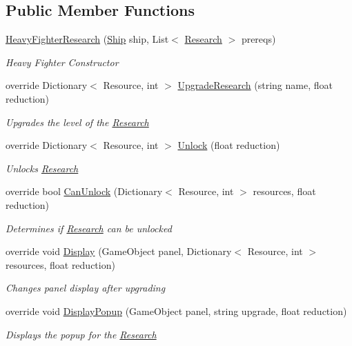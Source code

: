 \subsection*{Public Member Functions}
\begin{DoxyCompactItemize}
\item 
\hyperlink{class_heavy_fighter_research_a3b6b83b4c4dce96dafdefe3c9d2ce736}{Heavy\+Fighter\+Research} (\hyperlink{class_ship}{Ship} ship, List$<$ \hyperlink{class_research}{Research} $>$ prereqs)
\begin{DoxyCompactList}\small\item\em Heavy Fighter Constructor \end{DoxyCompactList}\item 
override Dictionary$<$ Resource, int $>$ \hyperlink{class_heavy_fighter_research_aad96c063ea5f6e3b473f4bd9dd7dcc86}{Upgrade\+Research} (string name, float reduction)
\begin{DoxyCompactList}\small\item\em Upgrades the level of the \hyperlink{class_research}{Research} \end{DoxyCompactList}\item 
override Dictionary$<$ Resource, int $>$ \hyperlink{class_heavy_fighter_research_ac5fb9e14f64823b2386e0dbc35992ea4}{Unlock} (float reduction)
\begin{DoxyCompactList}\small\item\em Unlocks \hyperlink{class_research}{Research} \end{DoxyCompactList}\item 
override bool \hyperlink{class_heavy_fighter_research_a5ff354ea940ac34f4da1be6246eba690}{Can\+Unlock} (Dictionary$<$ Resource, int $>$ resources, float reduction)
\begin{DoxyCompactList}\small\item\em Determines if \hyperlink{class_research}{Research} can be unlocked \end{DoxyCompactList}\item 
override void \hyperlink{class_heavy_fighter_research_a867ed4fb05de870ec77e80dd93ae5f19}{Display} (Game\+Object panel, Dictionary$<$ Resource, int $>$ resources, float reduction)
\begin{DoxyCompactList}\small\item\em Changes panel display after upgrading \end{DoxyCompactList}\item 
override void \hyperlink{class_heavy_fighter_research_a25476a66abf46ffb2b99d3d01b60c8a1}{Display\+Popup} (Game\+Object panel, string upgrade, float reduction)
\begin{DoxyCompactList}\small\item\em Displays the popup for the \hyperlink{class_research}{Research} \end{DoxyCompactList}\end{DoxyCompactItemize}
